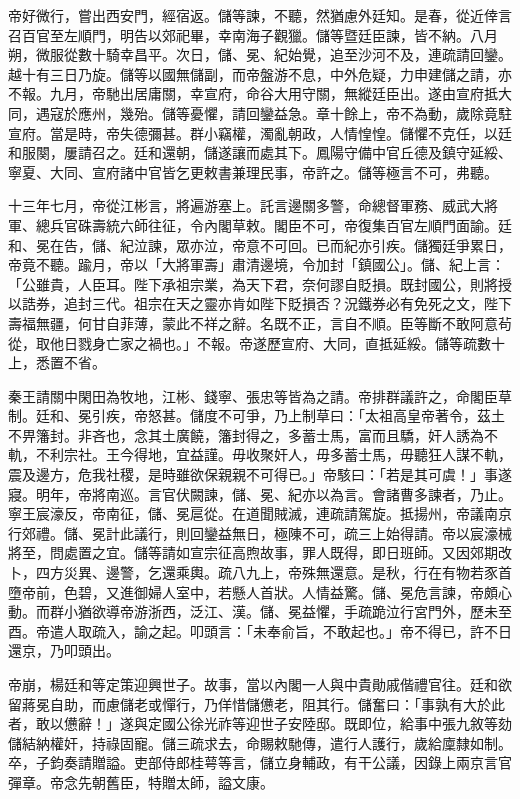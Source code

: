 \begin{pinyinscope}
帝好微行，嘗出西安門，經宿返。儲等諫，不聽，然猶慮外廷知。是春，從近倖言召百官至左順門，明告以郊祀畢，幸南海子觀獵。儲等暨廷臣諫，皆不納。八月朔，微服從數十騎幸昌平。次日，儲、冕、紀始覺，追至沙河不及，連疏請回鑾。越十有三日乃旋。儲等以國無儲副，而帝盤游不息，中外危疑，力申建儲之請，亦不報。九月，帝馳出居庸關，幸宣府，命谷大用守關，無縱廷臣出。遂由宣府抵大同，遇寇於應州，幾殆。儲等憂懼，請回鑾益急。章十餘上，帝不為動，歲除竟駐宣府。當是時，帝失德彌甚。群小竊權，濁亂朝政，人情惶惶。儲懼不克任，以廷和服闋，屢請召之。廷和還朝，儲遂讓而處其下。鳳陽守備中官丘德及鎮守延綏、寧夏、大同、宣府諸中官皆乞更敕書兼理民事，帝許之。儲等極言不可，弗聽。

十三年七月，帝從江彬言，將遍游塞上。託言邊關多警，命總督軍務、威武大將軍、總兵官硃壽統六師往征，令內閣草敕。閣臣不可，帝復集百官左順門面諭。廷和、冕在告，儲、紀泣諫，眾亦泣，帝意不可回。已而紀亦引疾。儲獨廷爭累日，帝竟不聽。踰月，帝以「大將軍壽」肅清邊境，令加封「鎮國公」。儲、紀上言：「公雖貴，人臣耳。陛下承祖宗業，為天下君，奈何謬自貶損。既封國公，則將授以誥券，追封三代。祖宗在天之靈亦肯如陛下貶損否？況鐵券必有免死之文，陛下壽福無疆，何甘自菲薄，蒙此不祥之辭。名既不正，言自不順。臣等斷不敢阿意茍從，取他日戮身亡家之禍也。」不報。帝遂歷宣府、大同，直抵延綏。儲等疏數十上，悉置不省。

秦王請關中閑田為牧地，江彬、錢寧、張忠等皆為之請。帝排群議許之，命閣臣草制。廷和、冕引疾，帝怒甚。儲度不可爭，乃上制草曰：「太祖高皇帝著令，茲土不畀籓封。非吝也，念其土廣饒，籓封得之，多蓄士馬，富而且驕，奸人誘為不軌，不利宗社。王今得地，宜益謹。毋收聚奸人，毋多蓄士馬，毋聽狂人謀不軌，震及邊方，危我社稷，是時雖欲保親親不可得已。」帝駭曰：「若是其可虞！」事遂寢。明年，帝將南巡。言官伏闕諫，儲、冕、紀亦以為言。會諸曹多諫者，乃止。寧王宸濠反，帝南征，儲、冕扈從。在道聞賊滅，連疏請駕旋。抵揚州，帝議南京行郊禮。儲、冕計此議行，則回鑾益無日，極陳不可，疏三上始得請。帝以宸濠械將至，問處置之宜。儲等請如宣宗征高煦故事，罪人既得，即日班師。又因郊期改卜，四方災異、邊警，乞還乘輿。疏八九上，帝殊無還意。是秋，行在有物若豕首墮帝前，色碧，又進御婦人室中，若懸人首狀。人情益驚。儲、冕危言諫，帝頗心動。而群小猶欲導帝游浙西，泛江、漢。儲、冕益懼，手疏跪泣行宮門外，歷未至酉。帝遣人取疏入，諭之起。叩頭言：「未奉俞旨，不敢起也。」帝不得已，許不日還京，乃叩頭出。

帝崩，楊廷和等定策迎興世子。故事，當以內閣一人與中貴勛戚偕禮官往。廷和欲留蔣冕自助，而慮儲老或憚行，乃佯惜儲憊老，阻其行。儲奮曰：「事孰有大於此者，敢以憊辭！」遂與定國公徐光祚等迎世子安陸邸。既即位，給事中張九敘等劾儲結納權奸，持祿固寵。儲三疏求去，命賜敕馳傳，遣行人護行，歲給廩隸如制。卒，子鈞奏請贈謚。吏部侍郎桂萼等言，儲立身輔政，有干公議，因錄上兩京言官彈章。帝念先朝舊臣，特贈太師，謚文康。


\end{pinyinscope}
